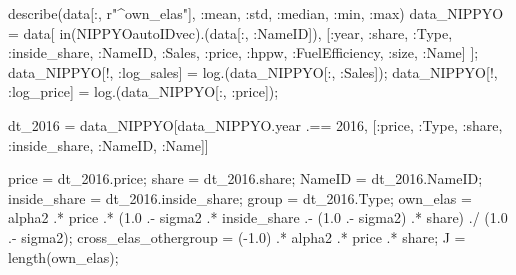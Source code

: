 \documentclass[
  letterpaper,
  DIV=11,
  numbers=noendperiod]{scrreprt}
\newenvironment{Shaded}{\begin{snugshade}}{\end{snugshade}}
\newcommand{\DataTypeTok}[1]{\textcolor[rgb]{0.68,0.00,0.00}{#1}}
\newcommand{\FloatTok}[1]{\textcolor[rgb]{0.68,0.00,0.00}{#1}}
\newcommand{\FunctionTok}[1]{\textcolor[rgb]{0.28,0.35,0.67}{#1}}
\newcommand{\NormalTok}[1]{\textcolor[rgb]{0.00,0.23,0.31}{#1}}
\newcommand{\OperatorTok}[1]{\textcolor[rgb]{0.37,0.37,0.37}{#1}}
\newcommand{\StringTok}[1]{\textcolor[rgb]{0.13,0.47,0.30}{#1}}
\begin{document}
\begin{Shaded}
\begin{Highlighting}[]
\FunctionTok{describe}\NormalTok{(data[}\OperatorTok{:}\NormalTok{, }\StringTok{r"\^{}own\_elas"}\NormalTok{], }\OperatorTok{:}\NormalTok{mean, }\OperatorTok{:}\NormalTok{std, }\OperatorTok{:}\NormalTok{median, }\OperatorTok{:}\NormalTok{min, }\OperatorTok{:}\NormalTok{max)}
\NormalTok{data\_NIPPYO }\OperatorTok{=}\NormalTok{ data[}
    \FunctionTok{in}\NormalTok{(NIPPYOautoIDvec).(data[}\OperatorTok{:}\NormalTok{, }\OperatorTok{:}\NormalTok{NameID]), }
\NormalTok{    [}\OperatorTok{:}\NormalTok{year, }\OperatorTok{:}\NormalTok{share, }\OperatorTok{:}\DataTypeTok{Type}\NormalTok{, }\OperatorTok{:}\NormalTok{inside\_share, }\OperatorTok{:}\NormalTok{NameID, }\OperatorTok{:}\NormalTok{Sales, }\OperatorTok{:}\NormalTok{price, }\OperatorTok{:}\NormalTok{hppw, }\OperatorTok{:}\NormalTok{FuelEfficiency, }\OperatorTok{:}\NormalTok{size, }\OperatorTok{:}\NormalTok{Name]}
\NormalTok{    ];}
\NormalTok{data\_NIPPYO[!, }\OperatorTok{:}\NormalTok{log\_sales] }\OperatorTok{=} \FunctionTok{log}\NormalTok{.(data\_NIPPYO[}\OperatorTok{:}\NormalTok{, }\OperatorTok{:}\NormalTok{Sales]);}
\NormalTok{data\_NIPPYO[!, }\OperatorTok{:}\NormalTok{log\_price] }\OperatorTok{=} \FunctionTok{log}\NormalTok{.(data\_NIPPYO[}\OperatorTok{:}\NormalTok{, }\OperatorTok{:}\NormalTok{price]);}

\NormalTok{dt\_2016 }\OperatorTok{=}\NormalTok{ data\_NIPPYO[data\_NIPPYO.year }\OperatorTok{.==} \FloatTok{2016}\NormalTok{, [}\OperatorTok{:}\NormalTok{price, }\OperatorTok{:}\DataTypeTok{Type}\NormalTok{, }\OperatorTok{:}\NormalTok{share, }\OperatorTok{:}\NormalTok{inside\_share, }\OperatorTok{:}\NormalTok{NameID, }\OperatorTok{:}\NormalTok{Name]]}

\NormalTok{price }\OperatorTok{=}\NormalTok{ dt\_2016.price;}
\NormalTok{share }\OperatorTok{=}\NormalTok{ dt\_2016.share;}
\NormalTok{NameID }\OperatorTok{=}\NormalTok{ dt\_2016.NameID;}
\NormalTok{inside\_share }\OperatorTok{=}\NormalTok{ dt\_2016.inside\_share;}
\NormalTok{group }\OperatorTok{=}\NormalTok{ dt\_2016.}\DataTypeTok{Type}\NormalTok{;}
\NormalTok{own\_elas }\OperatorTok{=}\NormalTok{ alpha2 }\OperatorTok{.*}\NormalTok{ price }\OperatorTok{.*}\NormalTok{ (}\FloatTok{1.0} \OperatorTok{.{-}}\NormalTok{ sigma2 }\OperatorTok{.*}\NormalTok{ inside\_share }\OperatorTok{.{-}}\NormalTok{ (}\FloatTok{1.0} \OperatorTok{.{-}}\NormalTok{ sigma2) }\OperatorTok{.*}\NormalTok{ share) }\OperatorTok{./}\NormalTok{ (}\FloatTok{1.0} \OperatorTok{.{-}}\NormalTok{ sigma2);}
\NormalTok{cross\_elas\_othergroup }\OperatorTok{=}\NormalTok{ (}\OperatorTok{{-}}\FloatTok{1.0}\NormalTok{) }\OperatorTok{.*}\NormalTok{ alpha2 }\OperatorTok{.*}\NormalTok{ price }\OperatorTok{.*}\NormalTok{ share;}
\NormalTok{J }\OperatorTok{=} \FunctionTok{length}\NormalTok{(own\_elas);}


\end{Highlighting}
\end{Shaded}
\end{document}
